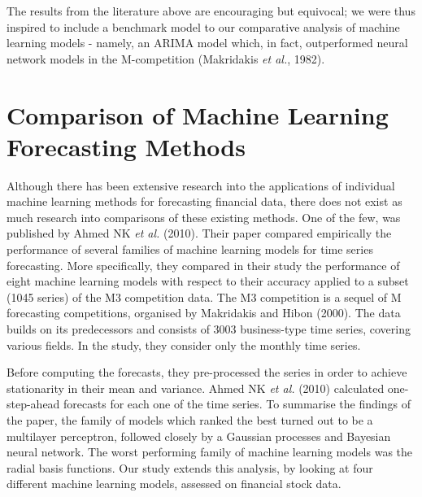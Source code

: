 The results from the literature above are encouraging but equivocal; we were thus inspired to include a benchmark model to our comparative analysis of machine learning models - namely, an ARIMA model which, in fact, outperformed neural network models in the M-competition (Makridakis \textit{et al.}, 1982). 



\section{Comparison of Machine Learning Forecasting Methods}

Although there has been extensive research into the applications of individual machine learning methods for forecasting financial data, there does not exist as much research into comparisons of these existing methods. One of the few, was published by Ahmed NK \textit{et al.} (2010). Their paper compared empirically the performance of several families of machine learning models for time series forecasting. More specifically, they compared in their study the performance of eight machine learning models with respect to their accuracy applied to a subset (1045 series) of the M3 competition data. The M3 competition is a sequel of M forecasting competitions, organised by Makridakis and Hibon (2000). The data builds on its predecessors and consists of 3003 business-type time series, covering various fields. In the study, they consider only the monthly time series. 

Before computing the forecasts, they pre-processed the series in order to achieve stationarity in their mean and variance. Ahmed NK \textit{et al.} (2010) calculated one-step-ahead forecasts for each one of the time series. To summarise the findings of the paper, the family of models which ranked the best turned out to be a multilayer perceptron, followed closely by a Gaussian processes and Bayesian neural network. The worst performing family of machine learning models was the radial basis functions. Our study extends this analysis, by looking at four different machine learning models, assessed on financial stock data.
